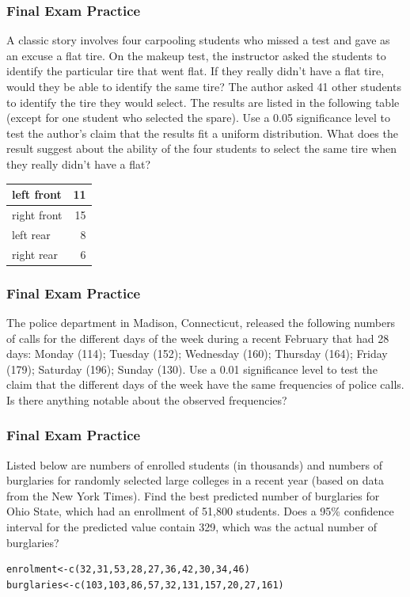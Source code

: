 \documentclass[xcolor=dvipsnames]{beamer}
\begin{document}
\begin{frame}
  \frametitle{Final Exam Practice}
  {\ubung} A classic story involves four carpooling students who
  missed a test and gave as an excuse a flat tire. On the makeup test,
  the instructor asked the students to identify the particular tire
  that went flat. If they really didn't have a flat tire, would they
  be able to identify the same tire? The author asked 41 other
  students to identify the tire they would select. The results are
  listed in the following table (except for one student who selected
  the spare). Use a 0.05 significance level to test the author's claim
  that the results fit a uniform distribution. What does the result
  suggest about the ability of the four students to select the same
  tire when they really didn't have a flat?

  \begin{tabular}{|l|r|}\hline
        left front  & 11 \\ \hline
        right front & 15 \\ \hline
        left rear   & 8  \\ \hline
        right rear  & 6  \\ \hline
  \end{tabular}
\end{frame}

\begin{frame}
  \frametitle{Final Exam Practice}
  {\ubung} The police department in Madison, Connecticut, released the
  following numbers of calls for the different days of the week during
  a recent February that had 28 days: Monday (114); Tuesday (152);
  Wednesday (160); Thursday (164); Friday (179); Saturday (196);
  Sunday (130). Use a 0.01 significance level to test the claim that
  the different days of the week have the same frequencies of police
  calls. Is there anything notable about the observed frequencies?
\end{frame}

\begin{frame}[fragile]
  \frametitle{Final Exam Practice}
  {\ubung} Listed below are numbers of enrolled students (in
  thousands) and numbers of burglaries for randomly selected large
  colleges in a recent year (based on data from the New York Times).
  Find the best predicted number of burglaries for Ohio State, which
  had an enrollment of 51,800 students. Does a 95\% confidence
  interval for the predicted value contain 329, which was the actual
  number of burglaries?
\begin{verbatim}
enrolment<-c(32,31,53,28,27,36,42,30,34,46)
burglaries<-c(103,103,86,57,32,131,157,20,27,161)
\end{verbatim}
\end{frame}
\end{document}

